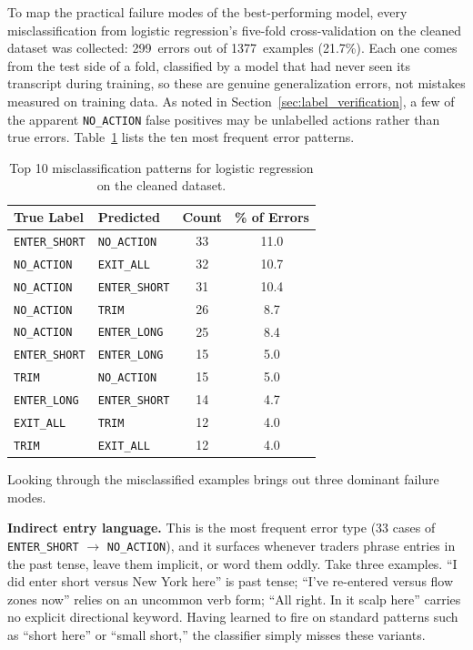 To map the practical failure modes of the best-performing model, every misclassification from logistic regression's five-fold cross-validation on the cleaned dataset was collected: 299~errors out of 1377~examples (21.7\%). Each one comes from the test side of a fold, classified by a model that had never seen its transcript during training, so these are genuine generalization errors, not mistakes measured on training data. As noted in Section~\ref{sec:label_verification}, a few of the apparent \texttt{NO\_ACTION} false positives may be unlabelled actions rather than true errors. Table~\ref{tab:error_patterns} lists the ten most frequent error patterns.

\begin{table}[H]
\centering
\caption{Top 10 misclassification patterns for logistic regression on the cleaned dataset.}
\label{tab:error_patterns}
\begin{tabular}{@{}llcc@{}}
\toprule
\textbf{True Label} & \textbf{Predicted} & \textbf{Count} & \textbf{\% of Errors} \\
\midrule
\texttt{ENTER\_SHORT}  & \texttt{NO\_ACTION}   & 33 & 11.0 \\
\texttt{NO\_ACTION}    & \texttt{EXIT\_ALL}    & 32 & 10.7 \\
\texttt{NO\_ACTION}    & \texttt{ENTER\_SHORT} & 31 & 10.4 \\
\texttt{NO\_ACTION}    & \texttt{TRIM}         & 26 &  8.7 \\
\texttt{NO\_ACTION}    & \texttt{ENTER\_LONG}  & 25 &  8.4 \\
\texttt{ENTER\_SHORT}  & \texttt{ENTER\_LONG}  & 15 &  5.0 \\
\texttt{TRIM}          & \texttt{NO\_ACTION}   & 15 &  5.0 \\
\texttt{ENTER\_LONG}   & \texttt{ENTER\_SHORT} & 14 &  4.7 \\
\texttt{EXIT\_ALL}     & \texttt{TRIM}         & 12 &  4.0 \\
\texttt{TRIM}          & \texttt{EXIT\_ALL}    & 12 &  4.0 \\
\bottomrule
\end{tabular}
\end{table}

Looking through the misclassified examples brings out three dominant failure modes.

\textbf{Indirect entry language.} This is the most frequent error type (33 cases of \texttt{ENTER\_SHORT} $\rightarrow$ \texttt{NO\_ACTION}), and it surfaces whenever traders phrase entries in the past tense, leave them implicit, or word them oddly. Take three examples. ``I did enter short versus New York here'' is past tense; ``I've re-entered versus flow zones now'' relies on an uncommon verb form; ``All right. In it scalp here'' carries no explicit directional keyword. Having learned to fire on standard patterns such as ``short here'' or ``small short,'' the classifier simply misses these variants.

